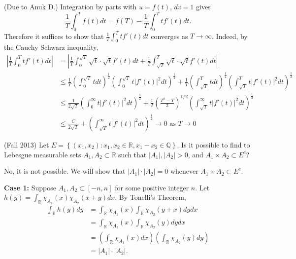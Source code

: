 \documentclass[answers]{exam}
\theoremstyle{problemstyle}
\newcommand{\1}[1]{\textbf{1}_{\left[#1\right]}} %
\def\R{\mathbb{R}} %
\def\Q{\mathbb{Q}} %
\begin{document}
\begin{questions}
\begin{solution}
(Due to Anuk D.) Integration by parts with $u=f(t)$, $dv=1$ gives
\begin{equation*}
  \frac{1}{T}\int_{0}^{T}f(t)dt = f(T) - \frac{1}{T}\int_{0}^{T}tf'(t)dt.
\end{equation*}
Therefore it suffices to show that $\frac{1}{T}\int_{0}^{T}tf'(t)dt$ converges as $T\to \infty$. Indeed, by the Cauchy Schwarz inequality,
\begin{align*}
  \left|\frac{1}{T}\int_{0}^{T}tf'(t)dt\right|
  &= \left|\frac{1}{T}\int_{0}^{\sqrt{T}}\sqrt{t}\cdot\sqrt{t}f'(t)dt + \frac{1}{T}\int_{\sqrt{T}}^{T}\sqrt{t}\cdot \sqrt{t}f'(t)dt\right|\\
  & \leq \frac{1}{T}\left(\int_{0}^{\sqrt{T}}t dt \right)^{\frac{1}{2}}\left( \int_{0}^{\sqrt{T}}t |f'(t)|^{2}dt \right)^{\frac{1}{2}}+ \frac{1}{T}\left( \int_{\sqrt{T}}^{T}tdt \right)^{\frac{1}{2}}\left( \int_{\sqrt{T}}^{T}t|f'(t)|^{2}dt \right)^{\frac{1}{2}}\\
  &\leq \frac{1}{2 \sqrt{T}} \left(\int_{0}^{\infty}t|f'(t)|^{2} dt \right)^{\frac{1}{2}} + \frac{1}{T}\left( \frac{T^{2}-T}{2} \right)^{1/2}\left(\int_{\sqrt{T}}^{\infty}t|f'(t)|^{2}dt \right)^{\frac{1}{2}}\\
  &\leq \frac{C}{2 \sqrt{T}}  +\left(\int_{\sqrt{T}}^{\infty} t|f'(t)|^{2}dt \right)^{\frac{1}{2}} \to 0 \text{ as }T\to 0
\end{align*}
\end{solution}



\question (Fall 2013) Let $E= \left\{ (x_{1},x_{2}) : x_{1},x_{2}\in \R, x_{1}-x_{2}\in \Q\right\}$. Is it possible to find to Lebesgue measurable sets $A_{1},A_{2}\subset\R$ such that $|A_{1}|,|A_{2}|>0$, and $A_{1}\times A_{2}\subset E^{c}$?
\begin{solution}
  No, it is not possible. We will show that $|A_{1}|\cdot|A_{2}| = 0$ whenever $A_{1}\times A_{2}\subset E^{c}$. 

 \textbf{ Case 1:} Suppose $A_{1},A_{2}\subset [-n,n]$ for some positive integer $n$.
  Let $h(y)= \int_{\R}\chi_{A_{1}}(x)\chi_{A_{2}}(x+y)dx$. By Tonelli's Theorem,
  \begin{align*}
    \int_{\R}h(y)dy
    &=\int_{\R} \chi_{A_{1}}(x) \int_{\R} \chi_{A_{2}}(y+x)dy dx\\
    &=\int_{\R} \chi_{A_{1}}(x) \int_{\R} \chi_{A_{2}}(y)dy dx\\
    &=\left(\int_{\R} \chi_{A_{1}}(x)dx\right)\left( \int_{\R} \chi_{A_{2}}(y)dy\right)\\
    &=|A_{1}|\cdot |A_{2}|.
  \end{align*}


\end{solution}
\end{questions}
\end{document}
